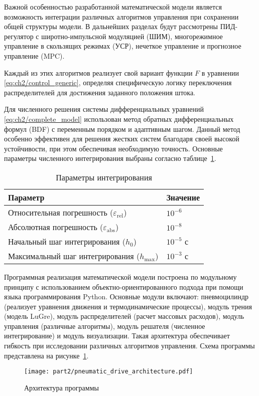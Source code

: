 Важной особенностью разработанной математической модели является возможность интеграции различных алгоритмов
управления при сохранении общей структуры модели. В дальнейших разделах будут рассмотрены ПИД-регулятор с широтно-импульсной
модуляцией (ШИМ), многорежимное управление в скользящих режимах (УСР), нечеткое управление и прогнозное управление (MPC).

Каждый из этих алгоритмов реализует свой вариант функции $F$ в уравнении \eqref{eq:ch2/control_generic}, определяя
специфическую логику переключения распределителей для достижения заданного положения штока.

Для численного решения системы дифференциальных уравнений \eqref{eq:ch2/complete_model} использован метод обратных
дифференциальных формул (BDF) с переменным порядком и адаптивным шагом. Данный метод особенно эффективен для
решения жестких систем благодаря своей высокой устойчивости, при этом обеспечивая необходимую точность.
Основные параметры численного интегрирования выбраны согласно таблице~\ref{tab:params}.

\begin{table}[h]
	\centering
	\caption{Параметры интегрирования}
	\begin{tabular}{ll}
		\midrule
		\textbf{Параметр}                                    & \textbf{Значение} \\
		\midrule
		Относительная погрешность ($\varepsilon_\text{rel}$) & $10^{-6}$         \\
		Абсолютная погрешность ($\varepsilon_\text{abs}$)    & $10^{-8}$         \\
		Начальный шаг интегрирования ($h_0$)                 & $10^{-5}$ с       \\
		Максимальный шаг интегрирования ($h_\text{max}$)     & $10^{-3}$ с       \\
		\midrule
	\end{tabular}
	\label{tab:params}
\end{table}

Программная реализация математической модели построена по модульному принципу с использованием объектно-ориентированного подхода при помощи языка программирования Python.
Основные модули включают: пневмоцилиндр (реализует уравнения движения и термодинамические процессы), модуль трения (модель LuGre),
модуль распределителей (расчет массовых расходов), модуль управления (различные алгоритмы),
модуль решателя (численное интегрирование) и модуль визуализации.
Такая архитектура обеспечивает гибкость при исследовании различных алгоритмов управления. Схема программы представлена на рисунке~\ref{fig:ch2/architecture}.

\begin{figure}[h]
	\centering
	\texttt{[image: part2/pneumatic\_drive\_architecture.pdf]}
	\caption{Архитектура программы}
	\label{fig:ch2/architecture}
\end{figure}
